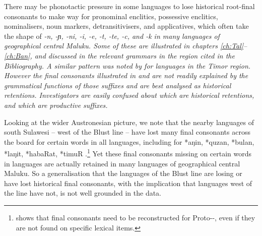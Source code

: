 There may be phonotactic pressure in some languages to lose historical
root-final consonants to make way for pronominal enclitics,
possessive enclitics, nominalisers, noun markers, detransitivisers,
and applicatives, which often take the shape of \it{-n,
-ɲ, -ni, -i, -e,
-t, -te, -c}, and \it{-k} in many languages of geographical central Maluku.
Some of these are illustrated in chapters \ref{ch:Tal}--\ref{ch:Ban},
and discussed in the relevant grammars in the region cited in the Bibliography.
A similar pattern was noted by \citet{Jonker1906} for languages
in the Timor region.
However the final consonants illustrated in 
and  are not readily explained by the grammatical functions
of those suffixes and are best analysed as historical retentions.
Investigators are easily confused about which are historical
retentions, and which are productive suffixes.

Looking at the wider Austronesian picture,
we note that the nearby  languages of south
Sulawesi -- west of the Blust line -- have lost many final consonants
across the board for certain words in all languages,
including for *aŋin, *quzan,
*bulan, *laŋit, *habaRat, *timuR \citep[103--178]{Mead1999}.\footnote{
		\citet{Mead1996}
		shows that final consonants need to be reconstructed for Proto--,
		even if they are not found on specific lexical items.}
Yet these final consonants missing on certain words in 
languages are actually retained in many languages of geographical central Maluku.
So a generalisation that the languages  of the Blust line
are losing or have lost historical final consonants,
with the implication that languages west of the line have not,
is not well grounded in the data.


